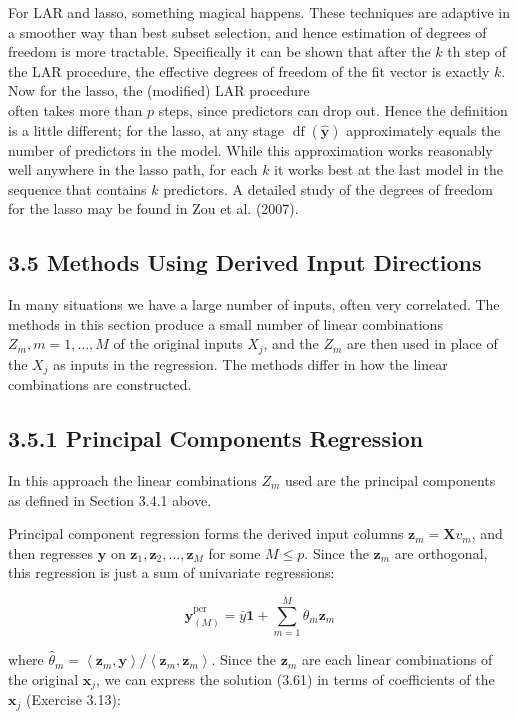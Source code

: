 \documentclass[10pt]{article}
\begin{document}
For LAR and lasso, something magical happens. These techniques are adaptive in a smoother way than best subset selection, and hence estimation of degrees of freedom is more tractable. Specifically it can be shown that after the $k$ th step of the LAR procedure, the effective degrees of freedom of the fit vector is exactly $k$. Now for the lasso, the (modified) LAR procedure\\
often takes more than $p$ steps, since predictors can drop out. Hence the definition is a little different; for the lasso, at any stage $\operatorname{df}(\hat{\mathbf{y}})$ approximately equals the number of predictors in the model. While this approximation works reasonably well anywhere in the lasso path, for each $k$ it works best at the last model in the sequence that contains $k$ predictors. A detailed study of the degrees of freedom for the lasso may be found in Zou et al. (2007).

\subsection*{3.5 Methods Using Derived Input Directions}
In many situations we have a large number of inputs, often very correlated. The methods in this section produce a small number of linear combinations $Z_{m}, m=1, \ldots, M$ of the original inputs $X_{j}$, and the $Z_{m}$ are then used in place of the $X_{j}$ as inputs in the regression. The methods differ in how the linear combinations are constructed.

\subsection*{3.5.1 Principal Components Regression}
In this approach the linear combinations $Z_{m}$ used are the principal components as defined in Section 3.4.1 above.

Principal component regression forms the derived input columns $\mathbf{z}_{m}= \mathbf{X} v_{m}$, and then regresses $\mathbf{y}$ on $\mathbf{z}_{1}, \mathbf{z}_{2}, \ldots, \mathbf{z}_{M}$ for some $M \leq p$. Since the $\mathbf{z}_{m}$ are orthogonal, this regression is just a sum of univariate regressions:


\begin{equation*}
\hat{\mathbf{y}}_{(M)}^{\mathrm{pcr}}=\bar{y} \mathbf{1}+\sum_{m=1}^{M} \hat{\theta}_{m} \mathbf{z}_{m} \tag{3.61}
\end{equation*}


where $\hat{\theta}_{m}=\left\langle\mathbf{z}_{m}, \mathbf{y}\right\rangle /\left\langle\mathbf{z}_{m}, \mathbf{z}_{m}\right\rangle$. Since the $\mathbf{z}_{m}$ are each linear combinations of the original $\mathbf{x}_{j}$, we can express the solution (3.61) in terms of coefficients of the $\mathbf{x}_{j}$ (Exercise 3.13):
\end{document}
